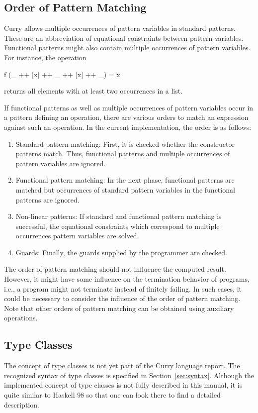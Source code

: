 \subsection{Order of Pattern Matching}

Curry allows multiple occurrences of pattern variables
in standard patterns. These are an abbreviation of equational constraints
between pattern variables.
Functional patterns might also contain multiple occurrences of
pattern variables.
For instance, the operation
\begin{curry}
f (_ ++ [x] ++ _ ++ [x] ++ _) = x
\end{curry}
returns all elements with at least two occurrences in a list.

If functional patterns as well as multiple occurrences of
pattern variables occur in a pattern defining an operation,
there are various orders to match an expression against such
an operation. In the current implementation, the order
is as follows:
\begin{enumerate}
\item Standard pattern matching: First, it is checked whether
the constructor patterns match. Thus, functional patterns
and multiple occurrences of pattern variables are ignored.
\item Functional pattern matching: In the next phase,
functional patterns are matched but occurrences of standard
pattern variables in the functional patterns are ignored.
\item Non-linear patterns: If standard and functional pattern matching
is successful, the equational constraints which correspond
to multiple occurrences pattern variables are solved.
\item Guards: Finally, the guards supplied by the programmer
are checked.
\end{enumerate}
The order of pattern matching should not influence the computed
result. However, it might have some influence on the termination
behavior of programs, i.e., a program might not terminate
instead of finitely failing.
In such cases, it could be necessary to consider the influence
of the order of pattern matching. Note that other orders of pattern matching
can be obtained using auxiliary operations.


\subsection{Type Classes}

The concept of type classes is not yet part of the Curry language report.
The recognized syntax of type classes is specified in
Section~\ref{sec:syntax}.
Although the implemented concept of type classes
is not fully described in this manual,
it is quite similar to Haskell 98 \cite{PeytonJones03Haskell}
so that one can look there to find a detailed description.


